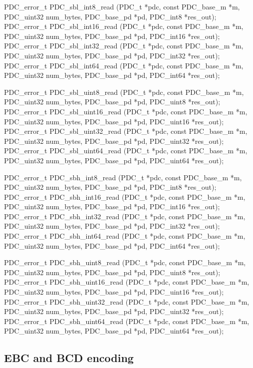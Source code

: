 \begin{tinycodeaux}{\leftmargin=0in}
\codeallowbreaks
PDC_error_t PDC_sbl_int8_read    (PDC_t *pdc, const PDC_base_m *m, PDC_uint32 num_bytes,
			         PDC_base_pd *pd, PDC_int8 *res_out);
PDC_error_t PDC_sbl_int16_read   (PDC_t *pdc, const PDC_base_m *m, PDC_uint32 num_bytes,
			         PDC_base_pd *pd, PDC_int16 *res_out);
PDC_error_t PDC_sbl_int32_read   (PDC_t *pdc, const PDC_base_m *m, PDC_uint32 num_bytes,
			         PDC_base_pd *pd, PDC_int32 *res_out);
PDC_error_t PDC_sbl_int64_read   (PDC_t *pdc, const PDC_base_m *m, PDC_uint32 num_bytes,
			         PDC_base_pd *pd, PDC_int64 *res_out);

PDC_error_t PDC_sbl_uint8_read   (PDC_t *pdc, const PDC_base_m *m, PDC_uint32 num_bytes,
			 	 PDC_base_pd *pd, PDC_uint8 *res_out);
PDC_error_t PDC_sbl_uint16_read  (PDC_t *pdc, const PDC_base_m *m, PDC_uint32 num_bytes,
			 	 PDC_base_pd *pd, PDC_uint16 *res_out);
PDC_error_t PDC_sbl_uint32_read  (PDC_t *pdc, const PDC_base_m *m, PDC_uint32 num_bytes,
			 	 PDC_base_pd *pd, PDC_uint32 *res_out);
PDC_error_t PDC_sbl_uint64_read  (PDC_t *pdc, const PDC_base_m *m, PDC_uint32 num_bytes,
			 	 PDC_base_pd *pd, PDC_uint64 *res_out);

PDC_error_t PDC_sbh_int8_read    (PDC_t *pdc, const PDC_base_m *m, PDC_uint32 num_bytes,
			         PDC_base_pd *pd, PDC_int8 *res_out);
PDC_error_t PDC_sbh_int16_read   (PDC_t *pdc, const PDC_base_m *m, PDC_uint32 num_bytes,
			         PDC_base_pd *pd, PDC_int16 *res_out);
PDC_error_t PDC_sbh_int32_read   (PDC_t *pdc, const PDC_base_m *m, PDC_uint32 num_bytes,
			         PDC_base_pd *pd, PDC_int32 *res_out);
PDC_error_t PDC_sbh_int64_read   (PDC_t *pdc, const PDC_base_m *m, PDC_uint32 num_bytes,
			         PDC_base_pd *pd, PDC_int64 *res_out);

PDC_error_t PDC_sbh_uint8_read   (PDC_t *pdc, const PDC_base_m *m, PDC_uint32 num_bytes,
			 	 PDC_base_pd *pd, PDC_uint8 *res_out);
PDC_error_t PDC_sbh_uint16_read  (PDC_t *pdc, const PDC_base_m *m, PDC_uint32 num_bytes,
			 	 PDC_base_pd *pd, PDC_uint16 *res_out);
PDC_error_t PDC_sbh_uint32_read  (PDC_t *pdc, const PDC_base_m *m, PDC_uint32 num_bytes,
			 	 PDC_base_pd *pd, PDC_uint32 *res_out);
PDC_error_t PDC_sbh_uint64_read  (PDC_t *pdc, const PDC_base_m *m, PDC_uint32 num_bytes,
			 	 PDC_base_pd *pd, PDC_uint64 *res_out);
\end{tinycodeaux}

\subsection{EBC and BCD encoding}


